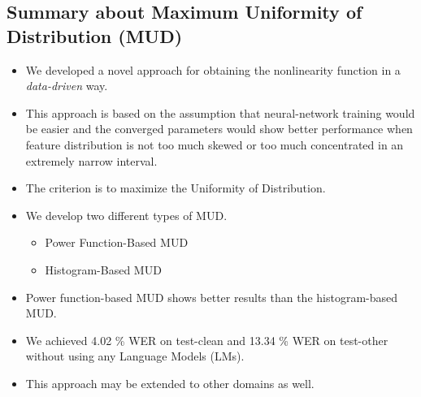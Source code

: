 \documentclass[a0,portrait]{a0poster}
\begin{document}
\begin{multicols}{2} %



\large

\color{Navy} %


\color{SaddleBrown} %

\section{Summary about Maximum Uniformity of Distribution (MUD)}
%
\begin{itemize}
  \item We developed a novel approach for obtaining {the \color{Navy} nonlinearity function} in a {\it data-driven } way.
  \item This approach is based on the assumption that neural-network training would be easier 
  and the converged parameters would show better
  performance when feature distribution is not too much
  skewed or too much concentrated in an extremely narrow interval. 

  \item The criterion is to maximize {\color{Navy} the Uniformity of Distribution}.
  \item We develop two different types of MUD. 
    \begin{itemize}
      \item Power Function-Based MUD
      \item Histogram-Based MUD
    \end{itemize}
  \item Power function-based MUD shows better results than the histogram-based MUD.
  \item We achieved 4.02 \%  WER on test-clean and 13.34 \% WER on test-other without using any Language Models (LMs).
  \item This approach may be extended to other domains as well.
\end{itemize}
%
%
\color{DarkSlateGray} %

\end{multicols}
\end{document}
